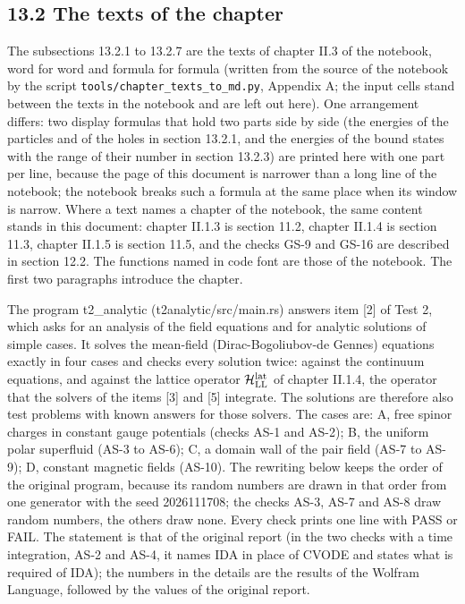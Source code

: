 \documentclass[
  10pt,
]{article}
\begin{document}
\hypertarget{the-texts-of-the-chapter}{%
\subsection{13.2 The texts of the
chapter}\label{the-texts-of-the-chapter}}

The subsections 13.2.1 to 13.2.7 are the texts of chapter II.3 of the
notebook, word for word and formula for formula (written from the source
of the notebook by the script \texttt{tools/chapter\_texts\_to\_md.py},
Appendix A; the input cells stand between the texts in the notebook and
are left out here). One arrangement differs: two display formulas that
hold two parts side by side (the energies of the particles and of the
holes in section 13.2.1, and the energies of the bound states with the
range of their number in section 13.2.3) are printed here with one part
per line, because the page of this document is narrower than a long line
of the notebook; the notebook breaks such a formula at the same place
when its window is narrow. Where a text names a chapter of the notebook,
the same content stands in this document: chapter II.1.3 is section
11.2, chapter II.1.4 is section 11.3, chapter II.1.5 is section 11.5,
and the checks GS-9 and GS-16 are described in section 12.2. The
functions named in code font are those of the notebook. The first two
paragraphs introduce the chapter.

The program t2\_analytic (t2analytic/src/main.rs) answers item {[}2{]}
of Test 2, which asks for an analysis of the field equations and for
analytic solutions of simple cases. It solves the mean-field
(Dirac-Bogoliubov-de Gennes) equations exactly in four cases and checks
every solution twice: against the continuum equations, and against the
lattice operator \(\mathcal H^{\rm lat}_{\rm LL}\) of chapter II.1.4,
the operator that the solvers of the items {[}3{]} and {[}5{]}
integrate. The solutions are therefore also test problems with known
answers for those solvers. The cases are: A, free spinor charges in
constant gauge potentials (checks AS-1 and AS-2); B, the uniform polar
superfluid (AS-3 to AS-6); C, a domain wall of the pair field (AS-7 to
AS-9); D, constant magnetic fields (AS-10). The rewriting below keeps
the order of the original program, because its random numbers are drawn
in that order from one generator with the seed 2026111708; the checks
AS-3, AS-7 and AS-8 draw random numbers, the others draw none. Every
check prints one line with PASS or FAIL. The statement is that of the
original report (in the two checks with a time integration, AS-2 and
AS-4, it names IDA in place of CVODE and states what is required of
IDA); the numbers in the details are the results of the Wolfram
Language, followed by the values of the original report.
\end{document}
